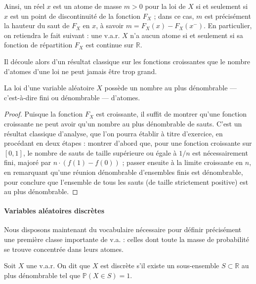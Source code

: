 Ainsi, un réel $x$ est un atome de masse $m > 0$ pour la loi de $X$ si et seulement si $x$ est un point de discontinuité de la fonction $F_X$ ; dans ce cas, $m$ est précisément la hauteur du saut de $F_X$ en $x$, à savoir $m = F_X(x) - F_X(x^-)$. En particulier, on retiendra le fait suivant : une v.a.r. $X$ n'a aucun atome si et seulement si sa fonction de répartition $F_X$ est continue sur $\mathbb{R}$.

Il découle alors d'un résultat classique sur les fonctions croissantes que le nombre d'atomes d'une loi ne peut jamais être trop grand.

\medskip

\begin{mdframed}
\begin{corollaire}
La loi d'une variable aléatoire $X$ possède un nombre au plus dénombrable — c'est-à-dire fini ou dénombrable — d'atomes.
\end{corollaire}
\end{mdframed}

\begin{proof}
Puisque la fonction $F_X$ est croissante, il suffit de montrer qu'une fonction croissante ne peut avoir qu'un nombre au plus dénombrable de sauts. C'est un résultat classique d'analyse, que l'on pourra établir à titre d'exercice, en procédant en deux étapes : montrer d'abord que, pour une fonction croissante sur $[0,1]$, le nombre de sauts de taille supérieure ou égale à $1/n$ est nécessairement fini, majoré par $n \cdot (f(1) - f(0))$ ; passer ensuite à la limite croissante en $n$, en remarquant qu'une réunion dénombrable d'ensembles finis est dénombrable, pour conclure que l'ensemble de tous les sauts (de taille strictement positive) est au plus dénombrable.
\end{proof}

\paragraph{Variables aléatoires discrètes}

Nous disposons maintenant du vocabulaire nécessaire pour définir précisément une première classe importante de v.a. : celles dont toute la masse de probabilité se trouve concentrée dans leurs atomes.

\medskip

\begin{mdframed}
\begin{definition}
Soit $X$ une v.a.r. On dit que $X$ est discrète s'il existe un sous-ensemble $S \subset \mathbb{R}$ au plus dénombrable tel que $\mathbb{P}(X \in S) = 1$.
\end{definition}
\end{mdframed}

